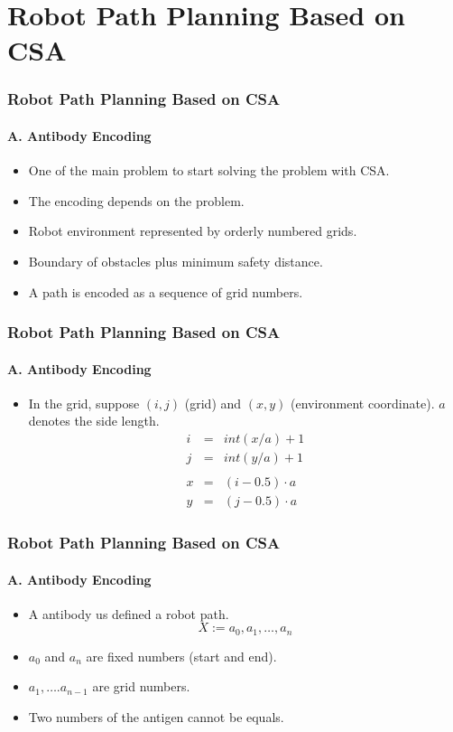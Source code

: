 \section{Robot Path Planning Based on CSA}
\frame
{
\frametitle{Robot Path Planning Based on CSA}
\framesubtitle{A. Antibody Encoding}
\begin{itemize}
	\item One of the main problem to start solving the problem with CSA.
	\item The encoding depends on the problem.
	\item Robot environment represented by orderly numbered grids.
	\item Boundary of obstacles plus minimum safety distance.
	\item A path is encoded as a sequence of grid numbers.
\end{itemize}
}


\frame
{
\frametitle{Robot Path Planning Based on CSA}
\framesubtitle{A. Antibody Encoding}
\begin{itemize}
	\item In the grid, suppose $(i,j)$ (grid) and $(x,y)$ (environment coordinate). $a$ denotes the side length.
	\begin{eqnarray}
		i &=& int(x/a) + 1 \\
		j &=& int(y/a) + 1 \nonumber\\\nonumber\\ 
		x &=& (i - 0.5)\cdot a \\
		y &=& (j - 0.5)\cdot a \nonumber
	\end{eqnarray}
\end{itemize}
}

\frame
{
\frametitle{Robot Path Planning Based on CSA}
\framesubtitle{A. Antibody Encoding}
\begin{itemize}
	\item A antibody us defined a robot path.
	$$X := {a_{0}, a_{1}, \ldots, a_{n}} $$
	\item $a_{0}$ and $a_{n}$ are fixed numbers (start and end).
	\item $a_{1}, \ldots. a_{n-1}$ are grid numbers.
	\item Two numbers of the antigen cannot be equals.
\end{itemize}
}

